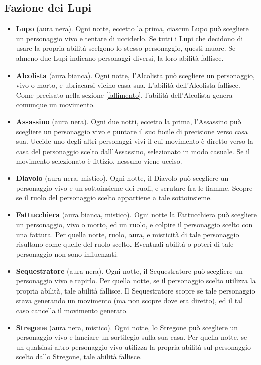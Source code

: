 \documentclass[a4paper,10pt]{article}
\begin{document}
\subsection*{Fazione dei Lupi}

\begin{itemize}
	
	\item {\bf Lupo} (aura nera). Ogni notte, eccetto la prima, ciascun Lupo può scegliere un personaggio vivo e tentare di ucciderlo. Se tutti i Lupi che decidono di usare la propria abilità scelgono lo stesso personaggio, questi muore. Se almeno due Lupi indicano personaggi diversi, la loro abilità fallisce.
	
	\item {\bf Alcolista} (aura bianca). Ogni notte, l'Alcolista può scegliere un personaggio, vivo o morto, e ubriacarsi vicino casa sua. L'abilità dell'Alcolista fallisce. Come precisato nella sezione \ref{fallimento}, l'abilità dell'Alcolista genera comunque un movimento.
	
	\item {\bf Assassino} (aura nera). Ogni due notti, eccetto la prima, l'Assassino può scegliere un personaggio vivo e puntare il suo fucile di precisione verso casa sua. Uccide uno degli altri personaggi vivi il cui movimento è diretto verso la casa del personaggio scelto dall'Assassino, selezionato in modo casuale. Se il movimento selezionato è fittizio, nessuno viene ucciso.

	\item {\bf Diavolo} (aura nera, mistico). Ogni notte, il Diavolo può scegliere un personaggio vivo e un sottoinsieme dei ruoli, e scrutare fra le fiamme. Scopre se il ruolo del personaggio scelto appartiene a tale sottoinsieme.
 
	\item {\bf Fattucchiera} (aura bianca, mistico). Ogni notte la Fattucchiera può scegliere un personaggio, vivo o morto, ed un ruolo, e colpire il personaggio scelto con una fattura. Per quella notte, ruolo, aura, e misticità di tale personaggio risultano come quelle del ruolo scelto. Eventuali abilità o poteri di tale personaggio non sono influenzati.

	\item {\bf Sequestratore} (aura nera). Ogni notte, il Sequestratore può scegliere un personaggio vivo e rapirlo. Per quella notte, se il personaggio scelto utilizza la propria abilità, tale abilità fallisce. Il Sequestratore scopre se tale personaggio stava generando un movimento (ma non scopre dove era diretto), ed il tal caso cancella il movimento generato.
	
	\item {\bf Stregone} (aura nera, mistico). Ogni notte, lo Stregone può scegliere un personaggio vivo e lanciare un sortilegio sulla sua casa. Per quella notte, se un qualsiasi altro personaggio vivo utilizza la propria abilità sul personaggio scelto dallo Stregone, tale abilità fallisce.
 
\end{itemize}
\end{document}
